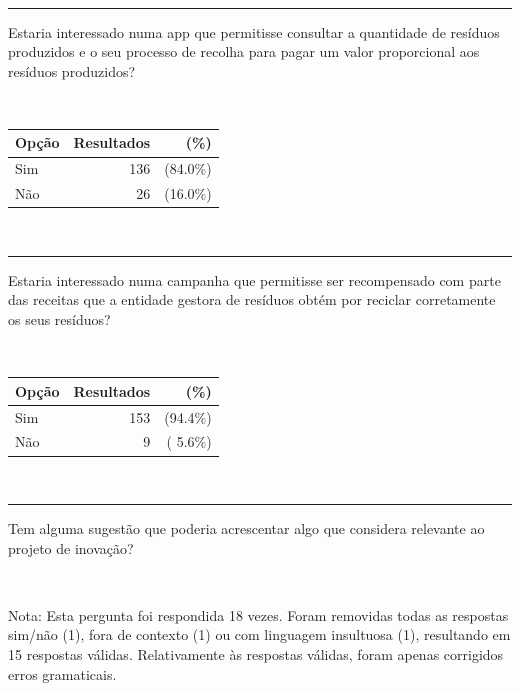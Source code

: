 \documentclass[11pt, a4paper, oneside]{book}
\begin{document}
\begin{appendices}
\begin{mdframed}[innerleftmargin=7.5mm, innerrightmargin=7.5mm, innertopmargin=7.5mm, innerbottommargin=7.5mm]
~

\rule{\linewidth}{0.5pt}\vspace{0.5em}

Estaria interessado numa app que permitisse consultar a quantidade de resíduos produzidos e o seu processo de recolha para pagar um valor proporcional aos resíduos produzidos?

~

\begin{tabular}{@{} l | r r @{} }
    \textbf{Opção} & \textbf{Resultados} & \textbf{(\%)} \\ \hline
    Sim & 136 & (84.0\%) \\
    Não &  26 & (16.0\%) \\
\end{tabular}

~

\rule{\linewidth}{0.5pt}\vspace{0.5em}

Estaria interessado numa campanha que permitisse ser recompensado com parte das receitas que a entidade gestora de resíduos obtém por reciclar corretamente os seus resíduos?

~

\begin{tabular}{@{} l | r r @{} }
    \textbf{Opção} & \textbf{Resultados} & \textbf{(\%)} \\ \hline
    Sim & 153 & (94.4\%) \\
    Não &   9 & ( 5.6\%) \\
\end{tabular}

~

\rule{\linewidth}{0.5pt}\vspace{0.5em}

Tem alguma sugestão que poderia acrescentar algo que considera relevante ao projeto de inovação?

~

{\color{black!75}Nota: Esta pergunta foi respondida 18 vezes. Foram removidas todas as respostas sim/não (1), fora de contexto (1) ou com linguagem insultuosa (1), resultando em 15 respostas válidas. Relativamente às respostas válidas, foram apenas corrigidos erros gramaticais.}

~

\noindent{}


\end{mdframed}
\end{appendices}
\end{document}
